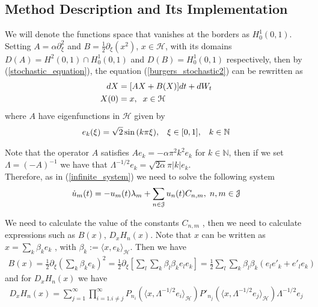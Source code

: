 \subsection{Method Description and Its Implementation}
	
	\noindent We will denote the functions space that vanishes at the borders as $H^1_0 (0, 1)$. Setting $A = \alpha \partial^2_{\xi}$ and $B = \frac{1}{2} \partial_{\xi} (x^2)$, $x \in \mathcal{H}$, with its domains $D(A) = H^2 (0, 1) \cap H^1_0 (0, 1)$ and $D(B) = H^1_0 (0, 1)$ respectively, then by (\ref{stochastic_equation}), the equation (\ref{burgers_stochastic2}) can be rewritten as
	\begin{align*}
    	dX &= [AX + B(X)]dt + dW_t \\
        X(0) &= x, \hspace{0.2cm} x \in \mathcal{H}
	\end{align*}	
	where $A$  have eigenfunctions in $\mathcal{H}$ given by
	\begin{align*}
		e_k (\xi) = \sqrt{2} \sin{(k \pi \xi)}, \hspace{3mm} \xi \in [0, 1], \hspace{3mm} k \in \mathbb{N}
	\end{align*}
	
	\noindent Note that the operator $A$ satisfies $Ae_k = -\alpha \pi^2 k^2 e_k$ for $k \in \mathbb{N}$, then if we set $\Lambda = (-A)^{-1}$ we have that $\Lambda^{-1/2} e_k = \sqrt{2 \alpha} \pi |k| e_k$. \\	
				
	Therefore, as in (\ref{infinite_system}) we need to solve the following system
	\begin{align}
		\dot{u}_{m} (t) = -u_{m} (t) \lambda_{m} + \displaystyle \sum _{n \in \mathcal{J}} u_{n} (t) C_{n, m} , \hspace{0.1cm} n, m \in \mathcal{J}
	\end{align}
		
	\noindent We need to calculate the value of the constants $C_{n,m}$ , then we need to calculate expressions such as $B(x)$, $D_x H_n (x)$. Note that $x$ can be written as $x = \displaystyle \sum_{k} \beta_k e_k$ , with $\beta_k := \langle x, e_k \rangle_{\mathcal{H}}$. Then we have
	\begin{align*}
		B(x) = \frac{1}{2} \partial_{\xi} \left( \displaystyle \sum_k \beta_k e_k \right)^2 = \frac{1}{2} \partial_{\xi} \left[ \sum_l
		\sum_k \beta_l \beta_k e_l e_k \right] = \frac{1}{2} \sum_l
		\sum_k \beta_l \beta_k (e_l e'_k + e'_l e_k)
	\end{align*}
	and for $D_x H_n (x)$ we have
	\begin{align*}
		D_x H_n (x) = \displaystyle \sum_{j = 1}^{\infty} \prod_{i = 1. i \neq j}^{\infty} P_{n_i} (\langle x, \Lambda^{-1 / 2} e_i \rangle_{\mathcal{H}}) P'_{n_j} (\langle x, \Lambda^{-1 / 2} e_j \rangle_{\mathcal{H}}) \Lambda^{-1 / 2} e_j 
	\end{align*}
	
